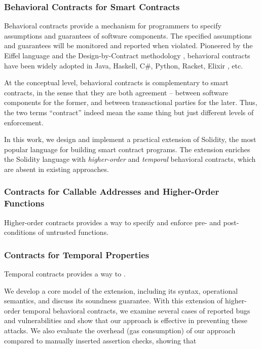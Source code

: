 \subsubsection*{\textbf{Behavioral Contracts for Smart Contracts}}
Behavioral contracts provide a mechanism for programmers to specify assumptions
and guarantees of software components. The specified assumptions and guarantees
will be monitored and reported when violated.
Pioneered by the Eiffel language \cite{DBLP:books/ph/Meyer91} and the
Design-by-Contract methodology \cite{DBLP:conf/tools/Meyer98a}, behavioral
contracts have been widely adopted in Java, Haskell, C\#, Python, Racket,
Elixir \cite{DBLP:conf/erlang/0001BBHMEF22}, etc. 


At the conceptual level, behavioral contracts is complementary to smart
contracts, in the sense that they are both agreement -- between software
components for the former, and between transactional parties for the later.
Thus, the two terms ``contract'' indeed mean the same thing but just different
levels of enforcement.

In this work, we design and implement a practical extension of Solidity, the
most popular language for building smart contract programs. The extension
enriches the Solidity language with \emph{higher-order} and \emph{temporal}
behavioral contracts, which are absent in existing approaches.

\subsubsection*{\textbf{Contracts for Callable Addresses and Higher-Order Functions}}
Higher-order contracts provides a way to specify and enforce pre- and
post-conditions of untrusted functions. 


\subsubsection*{\textbf{Contracts for Temporal Properties}}
Temporal contracts provides a way to .


We develop a core model of the extension, including its syntax,
operational semantics, and discuss its soundness guarantee.
With this extension of higher-order temporal behavioral contracts, we examine
several cases of reported bugs and vulnerabilities and show that
our approach is effective in preventing these attacks.
We also evaluate the overhead (gas consumption) of our approach
compared to manually inserted assertion checks, showing that 

